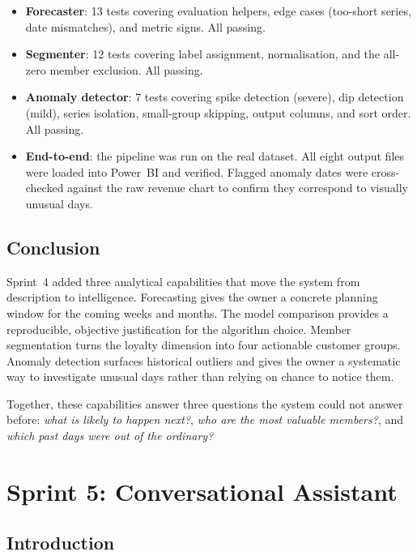 \begin{itemize}[noitemsep]
  \item \textbf{Forecaster}: 13 tests covering evaluation helpers, edge cases
        (too-short series, date mismatches), and metric signs. All passing.
  \item \textbf{Segmenter}: 12 tests covering label assignment, normalisation, and
        the all-zero member exclusion. All passing.
  \item \textbf{Anomaly detector}: 7 tests covering spike detection (severe), dip
        detection (mild), series isolation, small-group skipping, output columns, and
        sort order. All passing.
  \item \textbf{End-to-end}: the pipeline was run on the real dataset. All eight
        output files were loaded into Power~BI and verified. Flagged anomaly dates
        were cross-checked against the raw revenue chart to confirm they correspond
        to visually unusual days.
\end{itemize}

\section{Conclusion}

Sprint~4 added three analytical capabilities that move the system from description to
intelligence. Forecasting gives the owner a concrete planning window for the coming
weeks and months. The model comparison provides a reproducible, objective justification
for the algorithm choice. Member segmentation turns the loyalty dimension into four
actionable customer groups. Anomaly detection surfaces historical outliers and gives
the owner a systematic way to investigate unusual days rather than relying on chance
to notice them.

Together, these capabilities answer three questions the system could not answer before:
\textit{what is likely to happen next?}, \textit{who are the most valuable members?},
and \textit{which past days were out of the ordinary?}

\chapter{Sprint 5: Conversational Assistant}

\section{Introduction}

